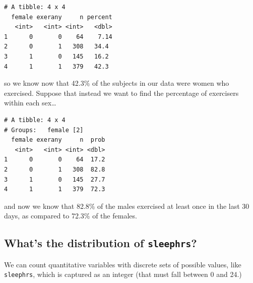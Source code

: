\documentclass[]{book}
\newenvironment{Shaded}{\begin{snugshade}}{\end{snugshade}}
\newcommand{\KeywordTok}[1]{\textcolor[rgb]{0.13,0.29,0.53}{\textbf{#1}}}
\newcommand{\DataTypeTok}[1]{\textcolor[rgb]{0.13,0.29,0.53}{#1}}
\newcommand{\DecValTok}[1]{\textcolor[rgb]{0.00,0.00,0.81}{#1}}
\newcommand{\StringTok}[1]{\textcolor[rgb]{0.31,0.60,0.02}{#1}}
\newcommand{\OperatorTok}[1]{\textcolor[rgb]{0.81,0.36,0.00}{\textbf{#1}}}
\newcommand{\NormalTok}[1]{#1}
\theoremstyle{definition}
\theoremstyle{definition}
\theoremstyle{definition}
\theoremstyle{remark}
\begin{document}
\begin{verbatim}
# A tibble: 4 x 4
  female exerany     n percent
   <int>   <int> <int>   <dbl>
1      0       0    64    7.14
2      0       1   308   34.4 
3      1       0   145   16.2 
4      1       1   379   42.3 
\end{verbatim}

so we know now that 42.3\% of the subjects in our data were women who
exercised. Suppose that instead we want to find the percentage of
exercisers within each sex\ldots{}

\begin{Shaded}
\end{Shaded}

\begin{verbatim}
# A tibble: 4 x 4
# Groups:   female [2]
  female exerany     n  prob
   <int>   <int> <int> <dbl>
1      0       0    64  17.2
2      0       1   308  82.8
3      1       0   145  27.7
4      1       1   379  72.3
\end{verbatim}

and now we know that 82.8\% of the males exercised at least once in the
last 30 days, as compared to 72.3\% of the females.

\subsection{\texorpdfstring{What's the distribution of
\texttt{sleephrs}?}{What's the distribution of sleephrs?}}\label{whats-the-distribution-of-sleephrs}

We can count quantitative variables with discrete sets of possible
values, like \texttt{sleephrs}, which is captured as an integer (that
must fall between 0 and 24.)

\begin{Shaded}
\end{Shaded}
\end{document}
